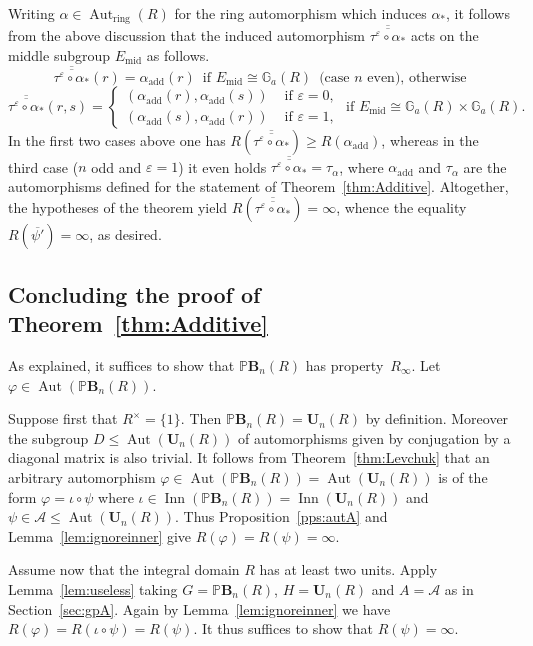 \documentclass[a4paper,11pt]{amsart}
\makeatletter
\numberwithin{equation}{section}
\theoremstyle{plain}
\theoremstyle{definition}
\renewenvironment{proof}[1][\proofname] {\par\pushQED{\qed}\normalfont\topsep6\p@\@plus6\p@\relax\trivlist\item[\hskip\labelsep\bfseries#1\@addpunct{.}]\ignorespaces}{\popQED\endtrivlist\@endpefalse}
\newcommand{\anel}[1]{#1_{\text{ring}}} %
\newcommand{\addi}[1]{#1_{\text{add}}} %
\newcommand{\mbU}{\mathbf{U}} %
\newcommand{\Addi}{\mathbb{G}_{a}} %
\newcommand{\PB}{\mathbb{P}\mathbf{B}} %
\newcommand{\phee}{\varphi} %
\newcommand{\veps}{\varepsilon} %
\newcommand{\barra}[1]{\overline{#1}}
\newcommand{\set}[1]{\{ #1 \}}
\newcommand{\mc}{\mathcal}
\newcommand{\Ri}{R_{\infty}} %
\DeclareMathOperator{\Aut}{Aut}
\DeclareMathOperator{\Inn}{Inn}
\makeatother
\begin{document}
\begin{proof}
Writing $\alpha \in \anel{\Aut}(R)$ for the ring automorphism which induces $\alpha_\ast$, it follows from the above discussion that the induced automorphism $\barra{\barra{\tau^\veps \circ \alpha_\ast}}$ acts on the middle subgroup $E_{\mathrm{mid}}$ as follows.
\[ \barra{\barra{\tau^\veps \circ \alpha_\ast}}(r) = \addi{\alpha}(r) \, \text{ if } E_{\mathrm{mid}} \cong \Addi(R) \, \text{ (case } n \text{ even), otherwise} \]
\[ \barra{\barra{\tau^\veps \circ \alpha_\ast}}(r,s) = \begin{cases} (\addi{\alpha}(r), \addi{\alpha}(s)) & \text{ if } \veps = 0, \\ (\addi{\alpha}(s), \addi{\alpha}(r)) & \text{ if } \veps=1, \end{cases} \text{ if } E_{\mathrm{mid}} \cong \Addi(R) \times \Addi(R).  \]
In the first two cases above one has $R(\barra{\barra{\tau^\veps \circ \alpha_\ast}}) \geq R(\addi{\alpha})$, whereas in the third case ($n$ odd and $\veps=1$) it even holds $\barra{\barra{\tau^\veps \circ \alpha_\ast}} = \tau_\alpha$, where $\addi{\alpha}$ and $\tau_\alpha$ are the automorphisms defined for the statement of Theorem~\ref{thm:Additive}. Altogether, the hypotheses of the theorem yield $R\left(\barra{\barra{\tau^\veps \circ \alpha_\ast}}\right) = \infty$, whence the equality $R(\barra{\psi'}) = \infty$, as desired.    
\end{proof}

\subsection{Concluding the proof of Theorem~\ref{thm:Additive}}\label{sec:provaThmB}

As explained, it suffices to show that $\PB_n(R)$ has property~$\Ri$. Let $\phee \in \Aut(\PB_n(R))$.

Suppose first that $R^\times=\set{1}$. Then $\PB_n(R) = \mbU_n(R)$ by definition. Moreover the subgroup $D \leq \Aut(\mbU_n(R))$ of automorphisms given by conjugation by a diagonal matrix is also trivial. It follows from Theorem~\ref{thm:Levchuk} that an arbitrary automorphism $\phee \in \Aut(\PB_n(R)) = \Aut(\mbU_n(R))$ is of the form $\phee = \iota \circ \psi$ where $\iota \in \Inn(\PB_n(R)) = \Inn(\mbU_n(R))$ and $\psi \in \mc{A} \leq \Aut(\mbU_n(R))$. Thus 
{Proposition~\ref{pps:autA}} and Lemma~\ref{lem:ignoreinner} give $R(\phee)=R(\psi) = \infty$. 

Assume now that the integral domain $R$ has at least two units. 
Apply Lemma~\ref{lem:useless} taking $G = \PB_n(R)$, $H = \mbU_n(R)$ and $A = \mc{A}$ as in Section~\ref{sec:gpA}. Again by Lemma~\ref{lem:ignoreinner} we have $R(\phee) = R(\iota \circ \psi) = R(\psi)$. It thus suffices to show that $R(\psi) = \infty$.
\end{document}
